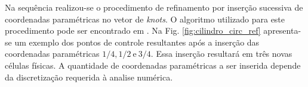 \documentclass[tese_patricia]{subfiles}
\begin{document}
Na sequência realizou-se o procedimento de refinamento por inserção sucessiva de coordenadas paramétricas no vetor de \textit{knots}. O algoritmo utilizado para este procedimento pode ser encontrado em . Na Fig. \ref{fig:cilindro_circ_ref} apresenta-se um exemplo dos pontos de controle resultantes após a inserção das coordenadas paramétricas $1/4, 1/2 \ \text{e} \ 3/4$. Essa inserção resultará em três novas células físicas. A quantidade de coordenadas paramétricas a ser inserida depende da discretização requerida à analise numérica.


\begin{figure}[!t]
	\centering
	  \ \ \

\end{figure}
\end{document}

